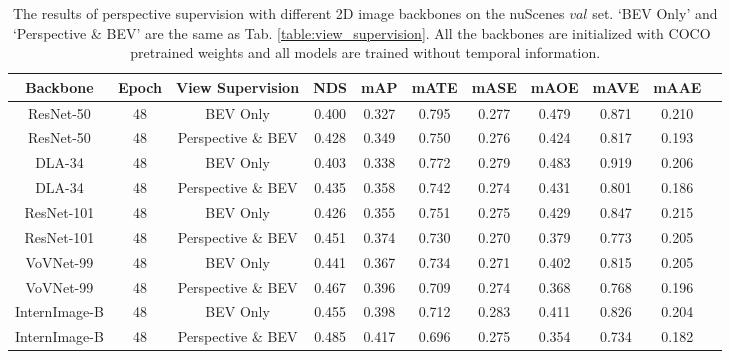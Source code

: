 \documentclass[10pt,twocolumn,letterpaper]{article}
\begin{document}
\setlength{\tabcolsep}{3pt}
\setlength{\doublerulesep}{2\arrayrulewidth}
\renewcommand{\arraystretch}{1.1}
\begin{table*}[ht]
    \caption{The results of perspective supervision with different 2D image backbones on the nuScenes $val$ set. `BEV Only' and `Perspective \& BEV' are the same as Tab. \ref{table:view_supervision}. All the backbones are initialized with COCO~\cite{COCO} pretrained weights and all models are trained without temporal information.}
    \label{table:large_backbone}
    \centering

    \begin{tabular}{c|c|c|cc|cccccc}
        \toprule
        Backbone & Epoch & View Supervision & NDS & mAP & mATE & mASE & mAOE & mAVE & mAAE   \\ 
        \midrule
        ResNet-50 & 48 & BEV Only & 0.400 & 0.327 & 0.795 & 0.277 & 0.479 &0.871 & 0.210 \\ 
        ResNet-50 & 48 & Perspective \& BEV & 0.428 & 0.349 & 0.750 & 0.276 & 0.424 & 0.817 & 0.193 \\
        \midrule
        DLA-34 & 48 & BEV Only & 0.403 & 0.338 & 0.772 & 0.279 & 0.483 & 0.919 & 0.206 \\ 
        DLA-34 & 48 & Perspective \& BEV & 0.435 & 0.358 & 0.742 & 0.274 & 0.431 & 0.801 & 0.186 \\  
  
        \midrule
        ResNet-101 & 48 & BEV Only & 0.426 & 0.355 & 0.751 & 0.275 & 0.429 & 0.847 & 0.215  \\ 
        ResNet-101 & 48 & Perspective \& BEV & 0.451 & 0.374 & 0.730 & 0.270 & 0.379 & 0.773 & 0.205  \\   
        \midrule
        VoVNet-99 & 48 & BEV Only & 0.441 & 0.367  & 0.734 & 0.271 & 0.402 & 0.815  & 0.205 \\ 
        VoVNet-99 & 48 & Perspective \& BEV & 0.467 & 0.396  & 0.709  & 0.274 & 0.368 & 0.768 & 0.196 \\ 
        \midrule
        InternImage-B & 48 & BEV Only & 0.455 & 0.398  & 0.712 & 0.283 & 0.411 & 0.826  & 0.204 \\ 
        InternImage-B & 48 & Perspective \& BEV & 0.485 & 0.417  & 0.696  & 0.275 & 0.354 & 0.734 & 0.182 \\ 
        \bottomrule
    \end{tabular}
    
\end{table*} \setlength{\tabcolsep}{3pt}
\setlength{\doublerulesep}{2\arrayrulewidth}
\end{document}
